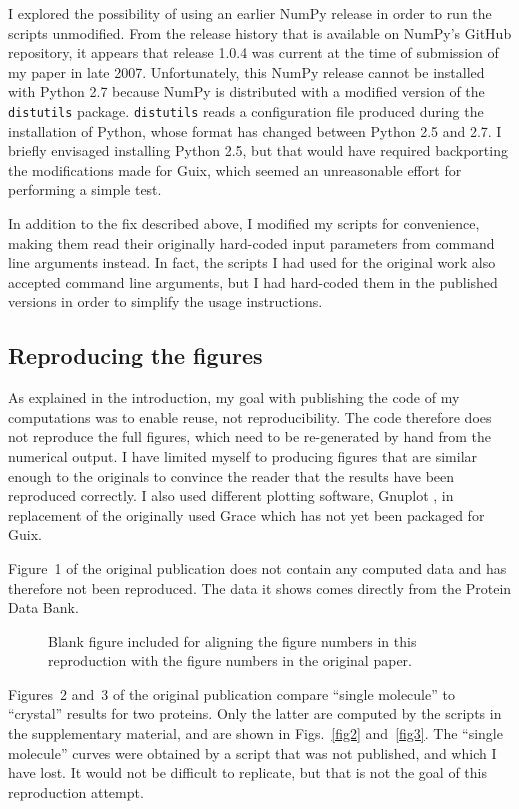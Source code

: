 I explored the possibility of using an earlier NumPy release in order to run the scripts unmodified. From the release history that is available on NumPy's GitHub repository, it appears that release 1.0.4 was current at the time of submission of my paper in late 2007. Unfortunately, this NumPy release cannot be installed with Python 2.7 because NumPy is distributed with a modified version of the \texttt{distutils} package. \texttt{distutils}  reads a configuration file produced during the installation of Python, whose format has changed between Python 2.5 and 2.7. I briefly envisaged installing Python 2.5, but that would have required backporting the modifications made for Guix, which seemed an unreasonable effort for performing a simple test.

In addition to the fix described above, I modified my scripts for convenience, making them read their originally hard-coded input parameters from  command line arguments instead. In fact, the scripts I had used for the original work also accepted command line arguments, but I had hard-coded them in the published versions in order to simplify the usage instructions.

\subsection*{Reproducing the figures}

As explained in the introduction, my goal with publishing the code of my computations was to enable reuse, not reproducibility. The code therefore does not reproduce the full figures, which need to be re-generated by hand from the numerical output. I have limited myself to producing figures that are similar enough to the originals to convince the reader that the results have been reproduced correctly. I also used different plotting software, Gnuplot \cite{WilliamsGnuplot2020}, in replacement of the originally used Grace \cite{GraceDevelopmentTeamGrace2008} which has not yet been packaged for Guix.

Figure~1 of the original publication does not contain any computed data and has therefore not been reproduced. The data it shows comes directly from the Protein Data Bank.

\begin{figure}
\caption{Blank figure included for aligning the figure numbers in this reproduction with the figure numbers in the original paper.}
\label{fig1}
\end{figure}

Figures~2 and~3 of the original publication compare ``single molecule'' to ``crystal'' results for two proteins. Only the latter are computed by the scripts in the supplementary material, and are shown in Figs.~\ref{fig2} and~\ref{fig3}. The ``single molecule'' curves were obtained by a script that was not published, and which I have lost. It would not be difficult to replicate, but that is not the goal of this reproduction attempt.

